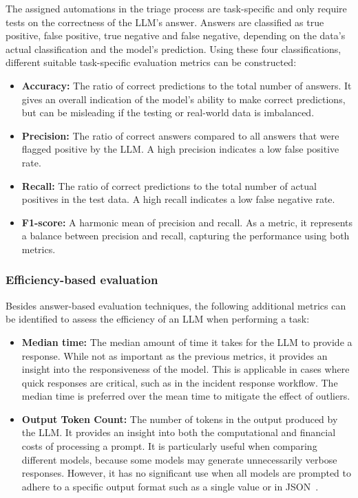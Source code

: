 The assigned automations in the triage process are task-specific and only require tests on the correctness of the LLM's
answer.
Answers are classified as true positive, false positive, true negative and false negative, depending on the data's
actual classification and the model's prediction.
Using these four classifications, different suitable task-specific evaluation metrics can be constructed:
\begin{itemize}
    \item \textbf{Accuracy:} The ratio of correct predictions to the total number of answers.
    It gives an overall indication of the model's ability to make correct predictions, but can be misleading if the
    testing or real-world data is imbalanced.

    \item \textbf{Precision:} The ratio of correct answers compared to all answers that were flagged positive by the
    LLM\@.
    A high precision indicates a low false positive rate.

    \item \textbf{Recall:} The ratio of correct predictions to the total number of actual positives in the test data.
    A high recall indicates a low false negative rate.

    \item \textbf{F1-score:} A harmonic mean of precision and recall.
    As a metric, it represents a balance between precision and recall, capturing the performance using both metrics.
\end{itemize}

\subsubsection{Efficiency-based evaluation}

Besides answer-based evaluation techniques, the following additional metrics can be identified to assess the efficiency
of an LLM when performing a task:
\begin{itemize}
    \item \textbf{Median time:} The median amount of time it takes for the LLM to provide a response.
    While not as important as the previous metrics, it provides an insight into the responsiveness of the model.
    This is applicable in cases where quick responses are critical, such as in the incident response workflow.
    The median time is preferred over the mean time to mitigate the effect of outliers.

    \item \textbf{Output Token Count:} The number of tokens in the output produced by the LLM\@.
    It provides an insight into both the computational and financial costs of processing a prompt.
    It is particularly useful when comparing different models, because some models may generate unnecessarily verbose
    responses.
    However, it has no significant use when all models are prompted to adhere to a specific output format such as a
    single value or in JSON\ \citep{bray2017json}.
\end{itemize}

